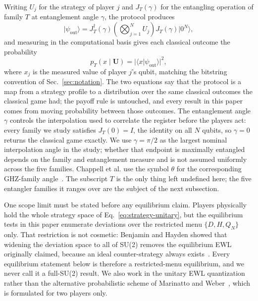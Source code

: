\documentclass[conference,letterpaper,10pt]{IEEEtran}
\newcommand{\ket}[1]{\ensuremath{|#1\rangle}}
\begin{document}
Writing $U_j$ for the strategy of player $j$ and $J_T(\gamma)$ for the entangling
operation of family $T$ at entanglement angle $\gamma$, the protocol produces
\begin{equation}
\ket{\psi_{\mathrm{out}}}
=J_T^{\dagger}(\gamma)
\left(\bigotimes_{j=1}^{N}U_j\right)
J_T(\gamma)\ket{0^N},
\label{eq:ewl-state}
\end{equation}
and measuring in the computational basis gives each classical outcome the
probability
\begin{equation}
p_T(x\mid\boldsymbol{U})=\lvert\langle x\ket{\psi_{\mathrm{out}}}\rvert^{2},
\label{eq:outcome-prob}
\end{equation}
where $x_j$ is the measured value of player $j$'s qubit, matching the bitstring
convention of Sec.~\ref{sec:notation}. The two equations say that the protocol
is a map from a strategy profile to a distribution over the same classical
outcomes the classical game had; the payoff rule is untouched, and every result
in this paper comes from moving probability between those outcomes. The
entanglement angle $\gamma$ controls the interpolation used to correlate the
register before the players act: every family we study satisfies $J_T(0)=I$,
the identity on all $N$ qubits, so $\gamma=0$ returns the classical game
exactly. We use $\gamma=\pi/2$ as the largest nominal interpolation angle in the
study; whether that endpoint is maximally entangled depends on the family and
entanglement measure and is not assumed uniformly across the five families.
Chappell et al. use the symbol $\theta$ for the corresponding GHZ-family
angle~\cite{chappell2012}. The subscript $T$ is the only thing left undefined
here; the five entangler families it ranges over are the subject of the next
subsection.

One scope limit must be stated before any equilibrium claim. Players physically
hold the whole strategy space of Eq.~\eqref{eq:strategy-unitary}, but the
equilibrium tests in this paper enumerate deviations over the restricted menu
$\{D,H,Q_N\}$ only. That restriction is not cosmetic: Benjamin and Hayden showed
that widening the deviation space to all of SU(2) removes the equilibrium EWL
originally claimed, because an ideal counter-strategy always
exists~\cite{benjamin2001comment}. Every equilibrium statement below is
therefore a restricted-menu equilibrium, and we never call it a full-SU(2)
result. We also work in the unitary EWL quantization rather than the alternative
probabilistic scheme of Marinatto and Weber~\cite{marinatto2000quantum}, which
is formulated for two players only.
\end{document}
